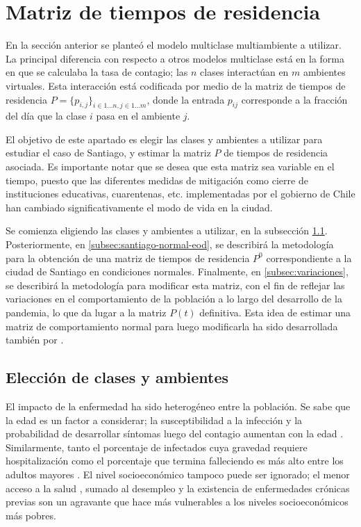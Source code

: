 \section{Matriz de tiempos de residencia}\label{met:matriz}

En la sección anterior se planteó el modelo multiclase multiambiente a utilizar. La principal diferencia con respecto a otros modelos multiclase está en la forma en que se calculaba la tasa de contagio; las \(n\) clases interactúan en \(m\) ambientes virtuales. Esta interacción está codificada por medio de la matriz de tiempos de residencia \( P =\{p_{i,j}\}_{i \in 1 \dots n, j \in 1 \dots m}\), donde la entrada \(p_{ij}\) corresponde a la fracción del día que la clase \(i\) pasa en el ambiente \(j\).

El objetivo de este apartado es elegir las clases y ambientes a utilizar para estudiar el caso de Santiago, y estimar la matriz \(P\) de tiempos de residencia asociada. Es importante notar que se desea que esta matriz sea variable en el tiempo, puesto que las diferentes medidas de mitigación como cierre de instituciones educativas, cuarentenas, etc. implementadas por el gobierno de Chile han cambiado significativamente el modo de vida en la ciudad.  

Se comienza eligiendo las clases y ambientes a utilizar, en la subsección \ref{subsec:eleccion-clases-ambientes}. Posteriormente, en \ref{subsec:santiago-normal-eod}, se describirá la metodología para la obtención de una matriz de tiempos de residencia \(P^0\) correspondiente a la ciudad de Santiago en condiciones normales. Finalmente, en \ref{subsec:variaciones}, se describirá la metodología para modificar esta matriz, con el fin de reflejar las variaciones en el comportamiento de la población a lo largo del desarrollo de la pandemia, lo que da lugar a la matriz \(P(t)\) definitiva. Esta idea de estimar una matriz de comportamiento normal para luego modificarla ha sido desarrollada también por \cite{Lai2020}.


\subsection{Elección de clases y ambientes}\label{subsec:eleccion-clases-ambientes}

El impacto de la enfermedad ha sido heterogéneo entre la población. Se sabe que la edad es un factor a considerar; la susceptibilidad a la infección y la probabilidad de desarrollar síntomas luego del contagio aumentan con la edad \cite{Davies2020}. Similarmente, tanto el porcentaje de infectados cuya gravedad requiere hospitalización como el porcentaje que termina falleciendo es más alto entre los adultos mayores \cite{Verity2020}. El nivel socioeconómico tampoco puede ser ignorado; el menor acceso a la salud \cite{Wang2020}, sumado al desempleo y la existencia de enfermedades crónicas previas \cite{Ahmed2020} son un agravante que hace más vulnerables a los niveles socioeconómicos más pobres.

